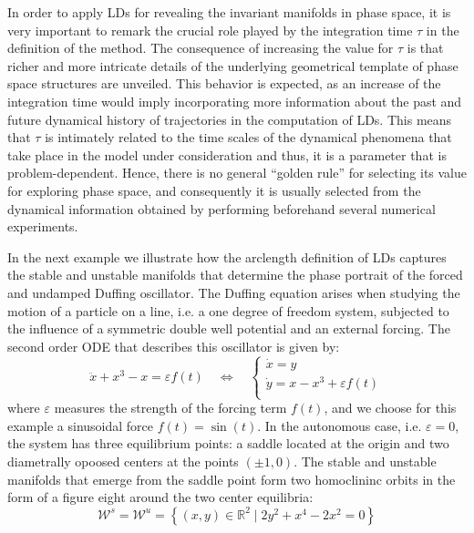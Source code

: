 \documentclass[8pt]{article}
\begin{document}
In order to apply LDs for revealing the invariant manifolds in phase space, it is very important to remark the crucial role played by the integration time $\tau$ in the definition of the method. The consequence of increasing the value for $\tau$ is that richer and more intricate details of the underlying geometrical template of phase space structures are unveiled. This behavior is expected, as an increase of the integration time would imply incorporating more information about the past and future dynamical history of trajectories in the computation of LDs. This means that $\tau$ is intimately related to the time scales of the dynamical phenomena that take place in the model under consideration and thus, it is a parameter that is problem-dependent. Hence, there is no general ``golden rule'' for selecting its value for exploring phase space, and consequently it is usually selected from the dynamical information obtained by performing beforehand several numerical experiments.

In the next example we illustrate how the arclength definition of LDs captures the stable and unstable manifolds that determine the phase portrait of the forced and undamped Duffing oscillator. The Duffing equation arises when studying the motion of a particle on a line, i.e. a one degree of freedom system, subjected to the influence of a symmetric double well potential and an external forcing. The second order ODE that describes this oscillator is given by:
\begin{equation}
\ddot{x} + x^3 - x = \varepsilon f(t) \quad \Leftrightarrow \quad 
\begin{cases}
\dot{x} = y \\
\dot{y} = x - x^3 + \varepsilon f(t) \\
\end{cases}
\end{equation}
where $\varepsilon$ measures the strength of the forcing term $f(t)$, and we choose for this example a sinusoidal force $f(t) = \sin(t)$. In the autonomous case, i.e. $\varepsilon = 0$, the system has three equilibrium points: a saddle located at the origin and two diametrally opoosed centers at the points $(\pm 1,0)$. The stable and unstable manifolds that emerge from the saddle point form two homoclininc orbits in the form of a figure eight around the two center equilibria:
\begin{equation}
\mathcal{W}^{s} = \mathcal{W}^{u} = \left\{(x,y) \in \mathbb{R}^2 \; \Big| \; 2y^2 + x^4 - 2x^2 = 0 \right\}
\label{duff_homocMani}
\end{equation}
\end{document}
